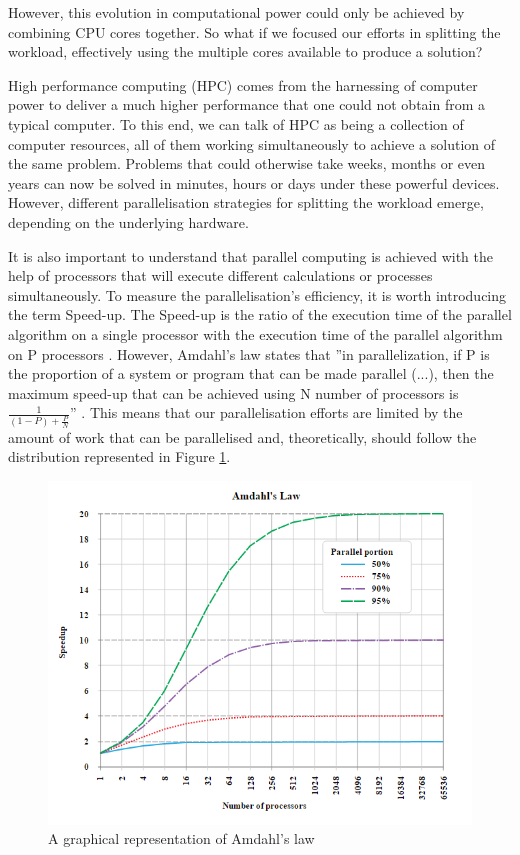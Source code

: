 \documentclass[12pt]{book}
\begin{document}
However, this evolution in computational power could only be achieved by combining CPU cores together.
So what if we focused our efforts in splitting the workload, effectively using the multiple cores available to produce a solution?\par
High performance computing (HPC) comes from the harnessing of computer power to deliver a much higher performance that one could not obtain from a typical computer. To this end, we can talk of HPC as being a collection of computer resources, all of them working simultaneously to achieve a solution of the same problem. Problems that could otherwise take weeks, months or even years can now be solved in minutes, hours or days under these powerful devices. However, different parallelisation strategies for splitting the workload emerge, depending on the underlying hardware. \par
It is also important to understand that parallel computing is achieved with the help of processors that will execute different calculations or processes simultaneously. To measure the parallelisation's efficiency, it is worth introducing the term Speed-up. The Speed-up is the ratio of the execution time of the parallel algorithm on a single processor with the execution time of the parallel algorithm on P processors \cite{irenehpc}. However, Amdahl's law states that ''in parallelization, if P is the proportion of a system or program that can be made parallel (...), then the maximum speed-up that can be achieved using N number of processors is $\frac{1}{\left(1-P\right)+\frac{P}{N}}$'' \cite{amdahl}. This means that our parallelisation efforts are limited by the amount of work that can be parallelised and, theoretically, should follow the distribution represented in Figure \ref{fig:amdahl}. 

\begin{figure}[H]
\centering
  \includegraphics[width=0.6\linewidth]{Resources/Images/amdahl.png}
  \caption{A graphical representation of Amdahl's law}
  \label{fig:amdahl}
\end{figure}
\end{document}
